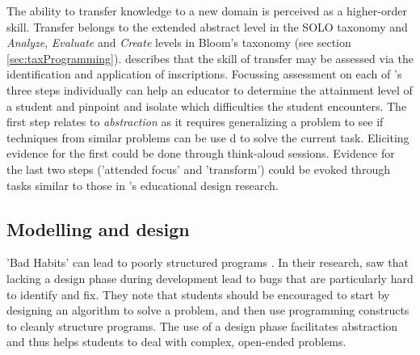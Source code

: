 The ability to transfer knowledge to a new domain is perceived as a higher-order skill. Transfer belongs to the extended abstract level in the SOLO taxonomy and \textit{Analyze}, \textit{Evaluate} and \textit{Create} levels in Bloom's taxonomy (see section \ref{sec:taxProgramming}).  describes that the skill of transfer may be assessed via the identification and application of inscriptions. Focussing assessment on each of \citeauthor{oers2004recontextualization}'s three steps individually can help an educator to determine the attainment level of a student and pinpoint and isolate which difficulties the student encounters. The first step relates to \emph{abstraction} as it requires generalizing a problem to see if techniques from similar problems can be use d to solve the current task\cite{CSTA2011CT}. Eliciting evidence for the first could be done through think-aloud sessions. Evidence for the last two steps ('attended focus' and 'transform') could be evoked through tasks similar to those in 's educational design research.




\subsection{Modelling and design}



'Bad Habits' can lead to poorly structured programs \cite{meerbaum2011habitsScratch}. In their research, \citeauthor{meerbaum2011habitsScratch} saw that lacking a design phase during development lead to bugs that are particularly hard to identify and fix. They note that students should be encouraged to start by designing an algorithm to solve a problem, and then use programming constructs to cleanly structure programs. The use of a design phase facilitates abstraction and thus helps students to deal with complex, open-ended problems.



